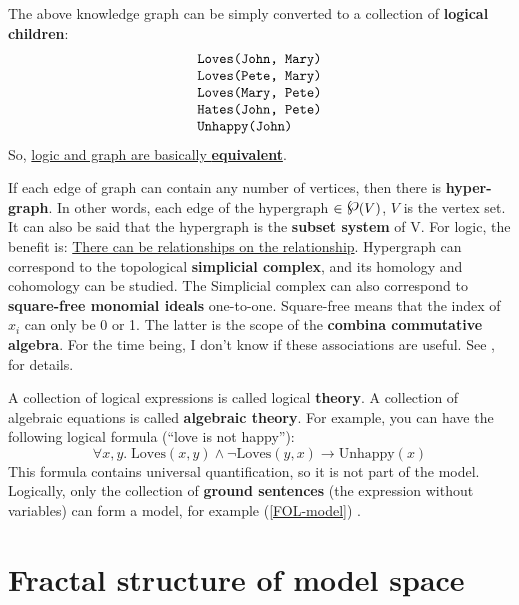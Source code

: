 \documentclass[12pt, orivec]{article}
\newcommand{\powerset}{\raisebox{.15\baselineskip}{\Large\ensuremath{\wp}}}
\begin{document}
The above knowledge graph can be simply converted to a collection of \textbf{logical children}:
\footnotesize
\begin{equation}
\begin{array}{l}
	\verb|Loves(John, Mary)| \\
	\verb|Loves(Pete, Mary)| \\
	\verb|Loves(Mary, Pete)| \\
	\verb|Hates(John, Pete)| \\
	\verb|Unhappy(John)|
\end{array}
\label{FOL-model}
\end{equation}
\normalsize
So, \uline{logic and graph are basically }\textbf{\uline{equivalent}}.
\begin{tcolorbox}[breakable, parbox=false]
If each edge of graph can contain any number of vertices, then there is \textbf{hyper-graph}. In other words, each edge of the hypergraph $\in \powerset(V)$, $V$ is the vertex set. It can also be said that the hypergraph is the \textbf{ subset system} of V. For logic, the benefit is: \uline{There can be relationships on the relationship}.
Hypergraph can correspond to the topological \textbf{simplicial complex}, and its homology and cohomology can be studied. The Simplicial complex can also correspond to \textbf{square-free monomial ideals} one-to-one. Square-free means that the index of $x_i$ can only be 0 or 1. The latter is the scope of the \textbf{combina commutative algebra}. For the time being, I don't know if these associations are useful. See \parencite{Brown2013}, \parencite{Miller2005} for details.\end{tcolorbox}

A collection of logical expressions is called logical \textbf{theory}. A collection of algebraic equations is called \textbf{algebraic theory}.
For example, you can have the following logical formula (``love is not happy''):\begin{equation}
\forall x,y. \; \mbox{Loves}(x,y) \wedge \neg \mbox{Loves}(y,x) \rightarrow \mbox{Unhappy}(x)
\end{equation}
This formula contains universal quantification, so it is not part of the model. Logically, only the collection of \textbf{ground sentences} (the expression without variables) can form a model, for example (\ref{FOL-model}) .

\section{Fractal structure of model space}
\end{document}
